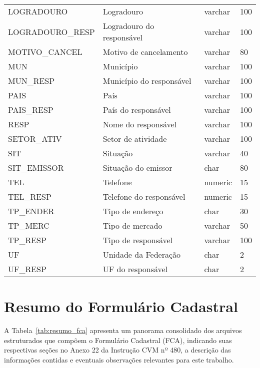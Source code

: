 \documentclass[recuosum=1.5cm]{iftex2024}
\begin{document}
\begin{longtable}{p{5cm} p{5cm} p{2cm} p{2cm}}
	LOGRADOURO & Logradouro & varchar & 100 \\
	LOGRADOURO\_RESP & Logradouro do responsável & varchar & 100 \\
	MOTIVO\_CANCEL & Motivo de cancelamento & varchar & 80 \\
	MUN & Município & varchar & 100 \\
	MUN\_RESP & Município do responsável & varchar & 100 \\
	PAIS & País & varchar & 100 \\
	PAIS\_RESP & País do responsável & varchar & 100 \\
	RESP & Nome do responsável & varchar & 100 \\
	SETOR\_ATIV & Setor de atividade & varchar & 100 \\
	SIT & Situação & varchar & 40 \\
	SIT\_EMISSOR & Situação do emissor & char & 80 \\
	TEL & Telefone & numeric & 15 \\
	TEL\_RESP & Telefone do responsável & numeric & 15 \\
	TP\_ENDER & Tipo de endereço & char & 30 \\
	TP\_MERC & Tipo de mercado & varchar & 50 \\
	TP\_RESP & Tipo de responsável & varchar & 100 \\
	UF & Unidade da Federação & char & 2 \\
	UF\_RESP & UF do responsável & char & 2 \\
	\bottomrule
\end{longtable}
\begin{flushleft}
\end{flushleft}


\chapter{Resumo do Formulário Cadastral}
\label{ap:estrutura-fca}

A Tabela~\ref{tab:resumo_fca} apresenta um panorama consolidado dos arquivos estruturados que compõem o Formulário Cadastral (FCA), indicando suas respectivas seções no Anexo 22 da Instrução CVM nº 480, a descrição das informações contidas e eventuais observações relevantes para este trabalho.
\end{document}
